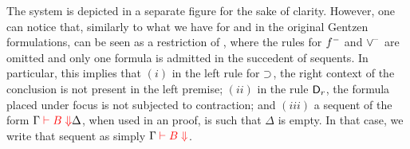 The system  \LJF is depicted in a separate figure for the sake of clarity.
%
However, one can notice that, similarly to what we have for \LJ and
\LK in the original Gentzen formulations, \LJF can be seen as a
restriction of \LKF, where the rules for $f^-$ and $\vee^{\!-}$ are
omitted and only one formula is admitted in the succedent of sequents.  In
particular, this implies that $(i)$ in the left rule for $\supset$, the
right context of the conclusion is not present in the left premise;
$(ii)$ in the rule $\mathsf{D}_r$, the formula placed under focus is
not subjected to contraction; and $(iii)$ a sequent of the form $\Gamma \;\textcolor{red}{\vdash B \Downarrow}{\Delta}$, when used in an
\LJF proof, is such that $\Delta$ is empty.
%
In that case, we write that sequent as simply $\Gamma \;\textcolor{red}{\vdash B \Downarrow}{}$.

